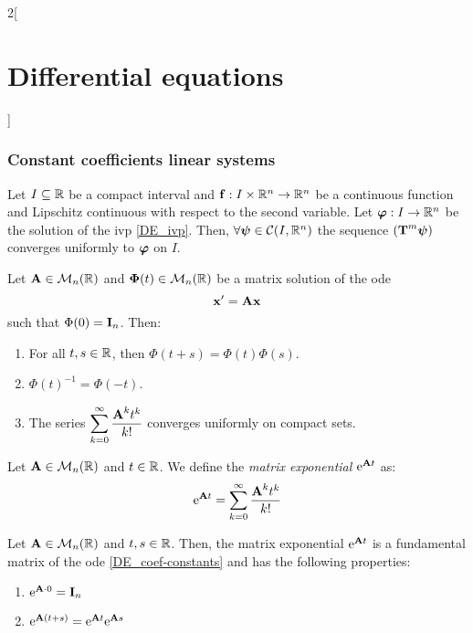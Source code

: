 \documentclass[../../../main.tex]{subfiles}
\begin{document}
\begin{multicols}{2}[\section{Differential equations}]
  \subsubsection{Constant coefficients linear systems}
  \begin{lemma}
    Let $I\subseteq\mathbb{R}$ be a compact interval and $\boldsymbol{\mathrm{f}}:I\times\mathbb{R}^n\rightarrow\mathbb{R}^n$ be a continuous function and Lipschitz continuous with respect to the second variable. Let $\boldsymbol{\mathrm{\varphi}}:I\rightarrow\mathbb{R}^n$ be the solution of the ivp \eqref{DE_ivp}. Then, $\forall\boldsymbol{\mathrm{\psi}}\in\mathcal{C}(I,\mathbb{R}^n)$ the sequence $(\boldsymbol{\mathrm{T}}^m\boldsymbol{\mathrm{\psi}})$ converges uniformly to $\boldsymbol{\mathrm{\varphi}}$ on $I$.
  \end{lemma}
  \begin{theorem}
    Let $\boldsymbol{\mathrm{A}}\in\mathcal{M}_n(\mathbb{R})$ and $\boldsymbol{\mathrm{\Phi}}(t)\in\mathcal{M}_n(\mathbb{R})$ be a matrix solution of the ode
    \begin{equation}\label{DE_coef-constants}
      \boldsymbol{\mathrm{x}}'=\boldsymbol{\mathrm{A}}\boldsymbol{\mathrm{x}}
    \end{equation}
    such that $\Phi(0)=\boldsymbol{\mathrm{I}}_n$. Then:
    \begin{enumerate}
      \item For all $t,s\in\mathbb{R}$, then $\Phi(t+s)=\Phi(t)\Phi(s)$.
      \item ${\Phi(t)}^{-1}=\Phi(-t)$.
      \item The series $\displaystyle\sum_{k=0}^\infty \frac{\boldsymbol{\mathrm{A}}^kt^k}{k!}$ converges uniformly on compact sets.
    \end{enumerate}
  \end{theorem}
  \begin{definition}
    Let $\boldsymbol{\mathrm{A}}\in\mathcal{M}_n(\mathbb{R})$ and $t\in\mathbb{R}$. We define the \textit{matrix exponential} $\mathrm{e}^{\boldsymbol{\mathrm{A}}t}$ as: $$\mathrm{e}^{\boldsymbol{\mathrm{A}}t}=\sum_{k=0}^\infty\frac{\boldsymbol{\mathrm{A}}^kt^k}{k!}$$
  \end{definition}
  \begin{prop}
    Let $\boldsymbol{\mathrm{A}}\in\mathcal{M}_n(\mathbb{R})$ and $t,s\in \mathbb{R}$. Then, the matrix exponential $\mathrm{e}^{\boldsymbol{\mathrm{A}}t}$ is a fundamental matrix of the ode \eqref{DE_coef-constants} and has the following properties:
    \begin{enumerate}
      \item $\mathrm{e}^{\boldsymbol{\mathrm{A}}\cdot 0}=\boldsymbol{\mathrm{I}}_n$
      \item $\mathrm{e}^{\boldsymbol{\mathrm{A}}(t+s)}=\mathrm{e}^{\boldsymbol{\mathrm{A}}t}\mathrm{e}^{\boldsymbol{\mathrm{A}}s}$

\end{enumerate}
\end{prop}
\end{multicols}
\end{document}
